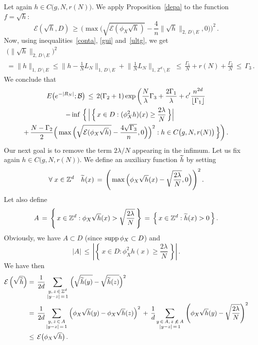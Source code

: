 \documentclass[10pt]{amsart}
\theoremstyle{definition}\newtheorem{defi}[theo]{Definition}\newtheorem{rema}[theo]{Remark}\newtheorem{exam}[theo]{Example}\newtheorem{exem}[theo]{Example}\newtheorem{nota}[theo]{Notation}
\newcommand{\tatop}[2]{\genfrac{}{}{0pt}{1}{#1}{#2}}
\newcommand*\supp{\text{supp\,}}
\newcommand*\Zd {{\mathbb Z^d}}
\newcommand*\wh{{\tilde h}}
\newcommand{\cE}{\mathcal{E}}
\let\oldtilde\tilde
\renewcommand*{\tilde}[1]{\mathchoice{\widetilde{#1}}{\widetilde{#1}}{\oldtilde{#1}}{\oldtilde{#1}}}\let\oldhat\hat
\renewcommand*{\hat}[1]{\mathchoice{\widehat{#1}}{\widehat{#1}}{\oldhat{#1}}{\oldhat{#1}}}\let\oldexists\exists
\renewcommand*{\exists}{\mathrel{\oldexists}}
\let\oldforall\forall
\renewcommand*{\forall}{\mathrel{\oldforall}}
\begin{document}
Let again $h\in C\big(g,N, r(N)\big)$. We apply Proposition~\ref{depa} to the function $f=\sqrt{h}$:
\[
\cE(\sqrt{h},D)\,\geq\,
\Bigg(\max
\Big(\sqrt{\cE(\phi_X\sqrt{h})}-
\frac{4}{n}
\|\sqrt{h}\|_{2,\,D\,\setminus\,E},0\Big)\Bigg)^2\,.
\]
Now, using inequalities~\eqref{conta}, \eqref{gui} and~\eqref{ultg}, we get
\begin{multline*}
\big(\|\sqrt{h}\|_{2,\,D\,\setminus\,E}\big)^2\\
= \|{h}\|_{1,\,D\,\setminus\,E} \leq
\Big\| h-\frac{1}{N}L_N
\Big\|_{1,\,D\,\setminus\,E} +
\Big\|
\frac{1}{N}L_N
\Big\|_{1,\,\Zd\,\setminus\,E}
\,
\,\leq\,\frac{\Gamma_1}{N}+r(N)+\frac{\Gamma_2}{N}
\,\leq\,\Gamma_3\,.
\end{multline*}
We conclude that
\begin{multline}\label{interm}
E\big(e^{-|R_N|}; {\mathcal B}
\big)\,\leq\, 2(\Gamma_2+1)
\exp\bigg(
\frac{N}{\lambda}\Gamma_3 +\frac{2\Gamma_1}{\lambda} + c'\frac{n^{2d}}{\lfloor\Gamma_1\rfloor}
\\
\mkern-33mu -\inf\,\Big\{\,
\Big|\,\Big\{\,x\in D: (\phi_X^2h)(x)\geq\frac{2\lambda}{N}
\,\Big\}\Big|\\
+\,\frac{N-\Gamma_2}{2}
\Big(\max\Big(\sqrt{\cE(\phi_X\sqrt{h})}-
\frac{4\sqrt{\Gamma_3}}{n},0\Big) \Big)^2 : h\in C\big(g,N,r(N) \big)
\,\Big\}\bigg)
\,.
\end{multline}
Our next goal is to remove the term $2\lambda/N$ appearing in the infimum. Let us fix again $h\in C\big(g,N,r(N) \big)$. We define an auxiliary function $\wh$ by setting
\[
\forall x \in\Zd\quad\wh(x)\,=\,\Bigg(\max\Big(\phi_X\sqrt{h}(x)-
\sqrt{\frac{2\lambda}{N}},0\Big)\Bigg)^2\,.
\]
Let also define
\[
A\,=\,\left\{\,x\in\Zd:
\phi_X\sqrt{h}(x)>
\sqrt{\frac{2\lambda}{N}}\,\right\}\,=\,
\Big\{\,x\in\Zd:
\wh(x)>0
\,\Big\}
\,.
\]
Obviously, we have $A\subset D$ (since $\supp \phi_X\subset D$) and
\[
\big|A\big|\,\leq\,
\left|\left\{\,x\in D:\phi_X^2h(x)\geq
{\frac{2\lambda}{N}} \,\right\}\right|\,.
\]
We have then
\begin{align*}
\cE\left(\sqrt{\wh}\right) & =\,
\frac{1}{2d}
\sum_{\tatop{y,\,z\,\in\,\Zd}{|y-z|\,=\,1}}
\Big(\sqrt{{\wh}(y)}-\sqrt{{\wh}(z)}\Big)^2\hfill\\
&=\,
\frac{1}{2d}\!
\sum_{\tatop{y,\,z\,\in\,A}{|y-z|\,=\,1}}
\Big(\phi_X\sqrt{h}(y)-\phi_X\sqrt{h}(z)\Big)^2
\,+\,
\frac{1}{d}\!
\sum_{\tatop{y\,\in\,A,\,z\,\not\,\in\,A}{|y-z|\,=\,1}}
\left(\phi_X\sqrt{h}(y)-
\sqrt{\frac{2\lambda}{N}}
\right)^2\\
&\leq\,
\cE\big(\phi_X\sqrt{h}\big)\,.
\end{align*}
\end{document}
